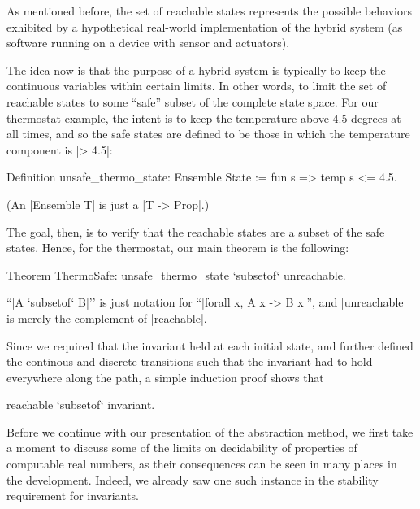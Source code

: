 \documentclass[runningheads]{llncs}
\begin{document}
As mentioned before, the set of reachable states represents the possible behaviors exhibited by a hypothetical real-world implementation of the hybrid system (as software running on a device with sensor and actuators).

The idea now is that the purpose of a hybrid system is typically to keep the continuous variables within certain limits. In other words, to limit the set of reachable states to some ``safe'' subset of the complete state space. For our thermostat example, the intent is to keep the temperature above 4.5 degrees at all times, and so the safe states are defined to be those in which the temperature component is |> 4.5|:

\begin{code}
  Definition unsafe_thermo_state: Ensemble State :=
    fun s => temp s <= 4.5.
\end{code}
(An |Ensemble T| is just a |T -> Prop|.)

The goal, then, is to verify that the reachable states are a subset of the safe states. Hence, for the thermostat, our main theorem is the following:
\begin{code}
  Theorem ThermoSafe: unsafe_thermo_state `subsetof` unreachable.
\end{code}
``|A `subsetof` B|'' is just notation for ``|forall x, A x -> B x|'', and |unreachable| is merely the complement of |reachable|.

Since we required that the invariant held at each initial state, and further defined the continous and discrete transitions such that the invariant had to hold everywhere along the path, a simple induction proof shows that
\begin{code}
  reachable `subsetof` invariant.
\end{code}


Before we continue with our presentation of the abstraction method, we first take a moment to discuss some of the limits on decidability of properties of computable real numbers, as their consequences can be seen in many places in the development. Indeed, we already saw one such instance in the stability requirement for invariants.


\end{document}

